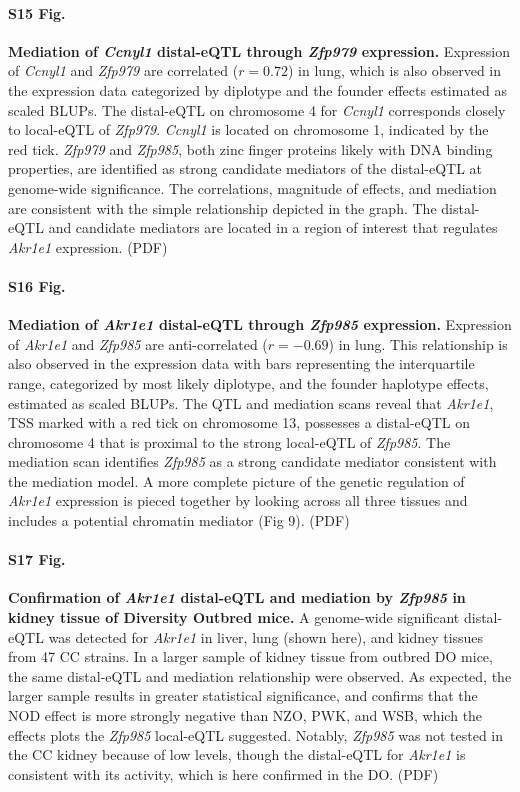 \documentclass[10pt,letterpaper]{article}
\begin{document}
\paragraph*{S15 Fig.}
\label{S_ccnyl1_exmediation}
{\bf Mediation of \textit{Ccnyl1} distal-eQTL through \textit{Zfp979} expression.}
Expression of \textit{Ccnyl1} and \textit{Zfp979} are correlated ($r = 0.72$) in lung, which is also observed in the expression data categorized by diplotype and the founder effects estimated as scaled BLUPs. The distal-eQTL on chromosome 4 for \textit{Ccnyl1} corresponds closely to local-eQTL of \textit{Zfp979}. \textit{Ccnyl1} is located on chromosome 1, indicated by the red tick. \textit{Zfp979} and \textit{Zfp985}, both zinc finger proteins likely with DNA binding properties, are identified as strong candidate mediators of the distal-eQTL at genome-wide significance. The correlations, magnitude of effects, and mediation are consistent with the simple relationship depicted in the graph. The distal-eQTL and candidate mediators are located in a region of interest that regulates \textit{Akr1e1} expression. (PDF)

\paragraph*{S16 Fig.}
\label{S_akr1e1_exmediation}
{\bf Mediation of \textit{Akr1e1} distal-eQTL through \textit{Zfp985} expression.}
Expression of \textit{Akr1e1} and \textit{Zfp985} are anti-correlated ($r = -0.69$) in lung. This relationship is also observed in the expression data with bars representing the interquartile range, categorized by most likely diplotype, and the founder haplotype effects, estimated as scaled BLUPs. The QTL and mediation scans reveal that \textit{Akr1e1}, TSS marked with a red tick on chromosome 13, possesses a distal-eQTL on chromosome 4 that is proximal to the strong local-eQTL of \textit{Zfp985}. The mediation scan identifies \textit{Zfp985} as a strong candidate mediator consistent with the mediation model. A more complete picture of the genetic regulation of \textit{Akr1e1} expression is pieced together by looking across all three tissues and includes a potential chromatin mediator (Fig 9). (PDF)

\paragraph*{S17 Fig.}
\label{S_do_akr1e1}
{\bf Confirmation of \textit{Akr1e1} distal-eQTL and mediation by \textit{Zfp985} in kidney tissue of Diversity Outbred mice.}
A genome-wide significant distal-eQTL was detected for \textit{Akr1e1} in liver, lung (shown here), and kidney tissues from 47 CC strains. In a larger sample of kidney tissue from outbred DO mice, the same distal-eQTL and mediation relationship were observed. As expected, the larger sample results in greater statistical significance, and confirms that the NOD effect is more strongly negative than NZO, PWK, and WSB, which the effects plots the \textit{Zfp985} local-eQTL suggested. Notably, \textit{Zfp985} was not tested in the CC kidney because of low levels, though the distal-eQTL for \textit{Akr1e1} is consistent with its activity, which is here confirmed in the DO. (PDF)
\end{document}
